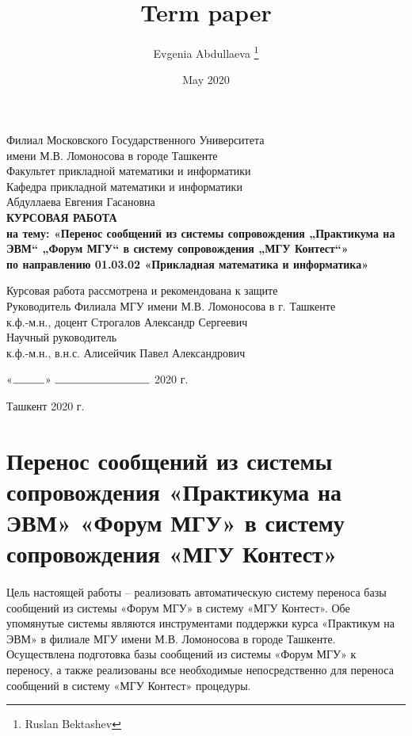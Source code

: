 \documentclass[12pt, a4paper, oneside]{article}
\title{Term paper}
\author{Evgenia Abdullaeva \thanks{Ruslan Bektashev}}
\date{May 2020}
\begin{document}
\begin{titlepage}
    \begin{center}
        Филиал Московского Государственного Университета\\
        имени М.В. Ломоносова в городе Ташкенте\\
        \vspace{0.5cm}
        Факультет прикладной математики и информатики\\
        Кафедра прикладной математики и информатики\\
        \vfill
        Абдуллаева Евгения Гасановна\\
        \vfill
        \textbf{КУРСОВАЯ РАБОТА\\
        на тему: «Перенос сообщений из системы сопровождения „Практикума на ЭВМ“ „Форум МГУ“ в систему сопровождения „МГУ Контест“»\\
        \vspace{0.5cm}
        по направлению 01.03.02 «Прикладная математика и информатика»}
    \end{center}
    \vfill
    \begin{flushleft}
        Курсовая работа рассмотрена и рекомендована к защите\\
        \vspace{0.5cm}
        Руководитель Филиала МГУ имени М.В. Ломоносова в г. Ташкенте\\
        к.ф.-м.н., доцент Строгалов Александр Сергеевич\\
        \vspace{0.5cm}
        Научный руководитель\\
        к.ф.-м.н., в.н.с. Алисейчик Павел Александрович
    \end{flushleft}
    \vfill
    \begin{flushright}
        «$\rule{1cm}{0.15mm}$» $\rule{3cm}{0.15mm}$ 2020 г.
    \end{flushright}
    \vfill
    \begin{center}
        Ташкент 2020 г.
    \end{center}
\end{titlepage}

\section*{Перенос сообщений из системы сопровождения «Практикума на ЭВМ» «Форум МГУ» в систему сопровождения «МГУ Контест»}
\paragraph{}
Цель настоящей работы – реализовать автоматическую систему переноса базы сообщений из системы «Форум МГУ» в систему «МГУ Контест». Обе упомянутые системы являются инструментами поддержки курса «Практикум на ЭВМ» в филиале МГУ имени М.В. Ломоносова в городе Ташкенте. Осуществлена подготовка базы сообщений из системы «Форум МГУ» к переносу, а также реализованы все необходимые непосредственно для переноса сообщений в систему «МГУ Контест» процедуры.
\setcounter{page}{2}
\newpage
\end{document}
